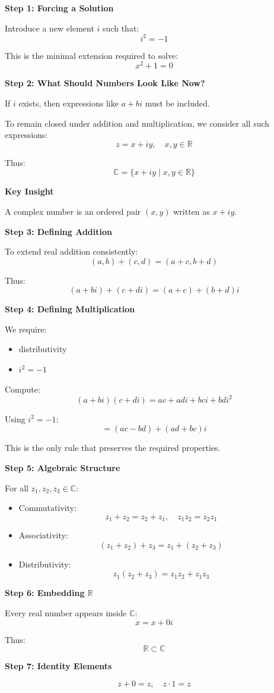 \documentclass[11pt]{article}
\newcommand{\R}{\mathbb{R}}
\newcommand{\C}{\mathbb{C}}
\begin{document}
\begin{theorybox}

\textbf{Step 1: Forcing a Solution}

Introduce a new element $i$ such that:
\[
i^2 = -1
\]

This is the minimal extension required to solve:
\[
x^2 + 1 = 0
\]

\textbf{Step 2: What Should Numbers Look Like Now?}

If $i$ exists, then expressions like $a + bi$ must be included.

To remain closed under addition and multiplication, we consider all such expressions:
\[
z = x + iy, \quad x,y \in \R
\]

Thus:
\[
\C = \{x + iy \mid x,y \in \R\}
\]

\textbf{Key Insight}

A complex number is an ordered pair $(x,y)$ written as $x + iy$.

\textbf{Step 3: Defining Addition}

To extend real addition consistently:
\[
(a,b) + (c,d) = (a+c, b+d)
\]

Thus:
\[
(a+bi) + (c+di) = (a+c) + (b+d)i
\]

\textbf{Step 4: Defining Multiplication}

We require:
\begin{itemize}
\item distributivity
\item $i^2 = -1$
\end{itemize}

Compute:
\[
(a+bi)(c+di)
= ac + adi + bci + bd i^2
\]

Using $i^2 = -1$:
\[
= (ac - bd) + (ad + bc)i
\]

This is the only rule that preserves the required properties.

\textbf{Step 5: Algebraic Structure}

For all $z_1, z_2, z_3 \in \C$:

\begin{itemize}
\item Commutativity:
\[
z_1 + z_2 = z_2 + z_1, \quad z_1 z_2 = z_2 z_1
\]

\item Associativity:
\[
(z_1 + z_2) + z_3 = z_1 + (z_2 + z_3)
\]

\item Distributivity:
\[
z_1(z_2 + z_3) = z_1 z_2 + z_1 z_3
\]
\end{itemize}

\textbf{Step 6: Embedding $\R$}

Every real number appears inside $\C$:
\[
x = x + 0i
\]

Thus:
\[
\R \subset \C
\]

\textbf{Step 7: Identity Elements}

\[
z + 0 = z, \quad z \cdot 1 = z
\]

\end{theorybox}
\end{document}
